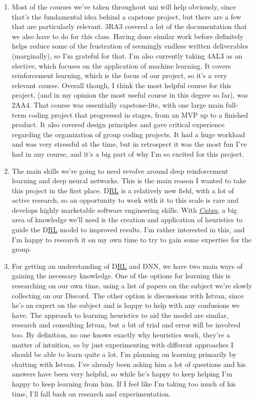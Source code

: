 \documentclass{article}
\newcommand{\Catan}{\href{https://en.wikipedia.org/wiki/Catan}{Catan}}
\newcommand{\RL}{\href{https://www.ibm.com/think/topics/reinforcement-learning}{RL}}
\begin{document}
\begin{enumerate}
    \item Most of the courses we've taken throughout uni will help obviously, since that's the fundamental idea behind a capstone project, but there are a few that are particularly relevant.
    3RA3 covered a lot of the documentation that we also have to do for this class.
    Having done similar work before definitely helps reduce some of the frustration of seemingly endless written deliverables (marginally), so I'm grateful for that.
    I'm also currently taking 4AL3 as an elective, which focuses on the application of machine learning.
    It covers reinforcement learning, which is the focus of our project, so it's a very relevant course.
    Overall though, I think the most helpful course for this project, (and in my opinion the most useful course in this degree so far), was 2AA4.
    That course was essentially capstone-lite, with one large main full-term coding project that progressed in stages, from an MVP up to a finished product.
    It also covered design principles and gave critical experience regarding the organization of group coding projects.
    It had a huge workload and was very stressful at the time, but in retrospect it was the most fun I've had in any course, and it's a big part of why I'm so excited for this project.

    \item The main skills we're going to need revolve around deep reinforcement learning and deep neural networks.
    This is the main reason I wanted to take this project in the first place.
    D\RL{} is a relatively new field, with a lot of active research, so an opportunity to work with it to this scale is rare and develops highly marketable software engineering skills.
    With \emph{\Catan{}}, a big area of knowledge we'll need is the creation and application of heuristics to guide the D\RL{} model to improved results.
    I'm rather interested in this, and I'm happy to research it on my own time to try to gain some expertise for the group.

    \item For getting an understanding of D\RL{} and DNN, we have two main ways of gaining the necessary knowledge.
    One of the options for learning this is researching on our own time, using a list of papers on the subject we're slowly collecting on our Discord.
    The other option is discussions with Istvan, since he's an expert on the subject and is happy to help with any confusions we have.
    The approach to learning heuristics to aid the model are similar, research and consulting Istvan, but a bit of trial and error will be involved too.
    By definition, no one knows exactly why heuristics work, they're a matter of intuition, so by just experimenting with different approaches I should be able to learn quite a lot.
    I'm planning on learning primarily by chatting with Istvan.
    I've already been asking him a lot of questions and his answers have been very helpful, so while he's happy to keep helping I'm happy to keep learning from him.
    If I feel like I'm taking too much of his time, I'll fall back on research and experimentation.

\end{enumerate}
\end{document}
